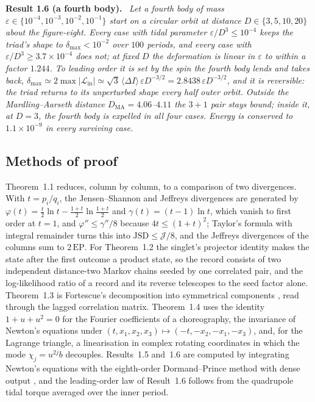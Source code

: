 \documentclass[11pt]{article}
\theoremstyle{definition}\newtheorem{definition}[theorem]{Definition}
\theoremstyle{remark}\newtheorem{remark}[theorem]{Remark}
\newenvironment{mainresult}[1]{\par\medskip\noindent\textbf{#1}\ \itshape\ignorespaces}{\par\medskip}
\begin{document}
\begin{mainresult}{Result 1.6 (a fourth body).}
Let a fourth body of mass $\varepsilon\in\{10^{-4},10^{-3},10^{-2},10^{-1}\}$ start on a circular orbit at distance $D\in\{3,5,10,20\}$ about the figure-eight. Every case with tidal parameter $\varepsilon/D^3\le10^{-4}$ keeps the triad's shape to $\delta_{\max}<10^{-2}$ over $100$ periods, and every case with $\varepsilon/D^3\ge3.7\times10^{-4}$ does not; at fixed $D$ the deformation is linear in $\varepsilon$ to within a factor $1.244$. To leading order it is set by the spin the fourth body lends and takes back, $\delta_{\max}\simeq2\max|\mathcal L_{\mathrm{in}}|\simeq\sqrt3\,\langle\Delta I\rangle\,\varepsilon D^{-3/2}=2.8438\,\varepsilon D^{-3/2}$, and it is reversible: the triad returns to its unperturbed shape every half outer orbit. Outside the Mardling--Aarseth distance $D_{\mathrm{MA}}=4.06$--$4.11$ the $3+1$ pair stays bound; inside it, at $D=3$, the fourth body is expelled in all four cases. Energy is conserved to $1.1\times10^{-9}$ in every surviving case.
\end{mainresult}

\subsection{Methods of proof}\label{sec:methods}
Theorem~1.1 reduces, column by column, to a comparison of two divergences. With $t=p_i/q_i$, the Jensen--Shannon and Jeffreys divergences are generated by $\varphi(t)=\frac t2\ln t-\frac{1+t}2\ln\frac{1+t}2$ and $\gamma(t)=(t-1)\ln t$, which vanish to first order at $t=1$, and $\varphi''\le\gamma''/8$ because $4t\le(1+t)^2$; Taylor's formula with integral remainder turns this into $\mathrm{JSD}\le\mathcal J/8$, and the Jeffreys divergences of the columns sum to $2\,\mathrm{EP}$. For Theorem~1.2 the singlet's projector identity makes the state after the first outcome a product state, so the record consists of two independent distance-two Markov chains seeded by one correlated pair, and the log-likelihood ratio of a record and its reverse telescopes to the seed factor alone. Theorem~1.3 is Fortescue's decomposition into symmetrical components \cite{Fortescue}, read through the lagged correlation matrix. Theorem~1.4 uses the identity $1+u+u^2=0$ for the Fourier coefficients of a choreography, the invariance of Newton's equations under $(t,x_1,x_2,x_3)\mapsto(-t,-x_2,-x_1,-x_3)$, and, for the Lagrange triangle, a linearisation in complex rotating coordinates in which the mode $\chi_j=u^{2j}b$ decouples. Results~1.5 and~1.6 are computed by integrating Newton's equations with the eighth-order Dormand--Prince method with dense output \cite{HNW}, and the leading-order law of Result~1.6 follows from the quadrupole tidal torque averaged over the inner period.
\end{document}

